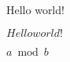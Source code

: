 \documentclass[12pt]{article}
\begin{document}
    Hello world!

    $ Hello world! $ 

    $ a \bmod b $
\end{document}
